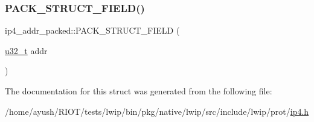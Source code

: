 \mbox{\label{structip4__addr__packed_a829ac9d684c84b953bd111251ea037a6}} 
\subsubsection{\texorpdfstring{P\+A\+C\+K\+\_\+\+S\+T\+R\+U\+C\+T\+\_\+\+F\+I\+E\+L\+D()}{PACK\_STRUCT\_FIELD()}\hspace{0.1cm}{\footnotesize\ttfamily [2/2]}}
{\footnotesize\ttfamily ip4\+\_\+addr\+\_\+packed\+::\+P\+A\+C\+K\+\_\+\+S\+T\+R\+U\+C\+T\+\_\+\+F\+I\+E\+LD (\begin{DoxyParamCaption}\item[{\hyperlink{group__compiler__abstraction_ga4c14294869aceba3ef9d4c0c302d0f33}{u32\+\_\+t}}]{addr }\end{DoxyParamCaption})}



The documentation for this struct was generated from the following file\+:\begin{DoxyCompactItemize}
\item 
/home/ayush/\+R\+I\+O\+T/tests/lwip/bin/pkg/native/lwip/src/include/lwip/prot/\hyperlink{native_2lwip_2src_2include_2lwip_2prot_2ip4_8h}{ip4.\+h}\end{DoxyCompactItemize}
